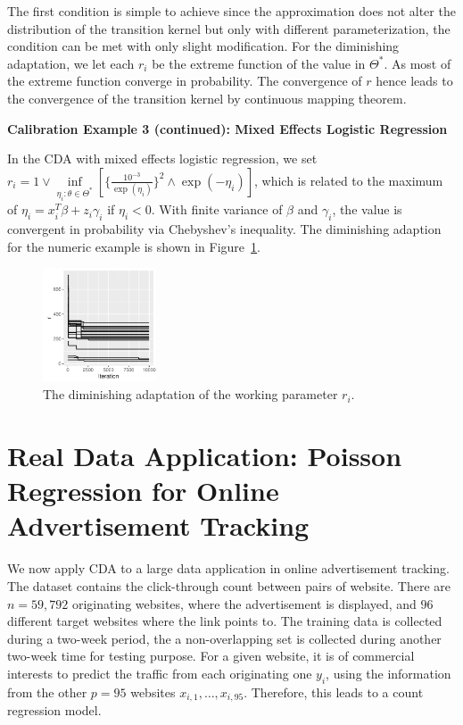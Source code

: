 \documentclass[10pt]{article}
\newcommand{\xbeta}{ x_i^T \beta}
\begin{document}
The first condition is simple to achieve since the approximation does not alter the distribution of the transition kernel but only with different parameterization, the condition can be met with only slight modification. For the diminishing adaptation, we let each $r_i$  be  the extreme function of the value in $\varTheta^*$. As most of the extreme function converge in probability. The convergence of $r$ hence leads to the convergence of the transition kernel by continuous mapping theorem.

{\bf Calibration Example 3 (continued): Mixed Effects Logistic Regression}

In the CDA with mixed effects logistic regression, we set $r_i =  1 \vee \underset{\eta_i: \theta\in \varTheta^*}{\inf}[\{\frac{10^{-3} }{\exp(\eta_i)}\}^2  \wedge {\exp(-\eta_i)} ]   $, which is related to the maximum of $\eta_i=\xbeta+z_i\gamma_i$ if $\eta_i<0$. With finite variance of $\beta$ and $\gamma_i$, the value is convergent in probability via Chebyshev's inequality. The diminishing adaption for the numeric example is shown in Figure~\ref{diminishing_adapt}.

 \begin{figure}[H]
 \centering
 \includegraphics[width=0.3\textwidth]{r_adaptation.pdf}
  \caption{The diminishing adaptation of the working parameter $r_i$.}
  \label{diminishing_adapt}
 \end{figure}

\section{Real Data Application: Poisson Regression for Online Advertisement Tracking}

We now apply CDA to a large data application in online advertisement tracking. The dataset contains the click-through count between pairs of website. There are $n=59,792$ originating websites, where the advertisement is displayed, and $96$ different target websites where the link points to. The training data is collected during a two-week period, the a non-overlapping set is collected during another two-week time for testing purpose. For a given website, it is of commercial interests to predict the traffic from each originating one $y_i$, using the information from the other $p=95$ websites $x_{i,1},\ldots, x_{i,95}$. Therefore, this leads to a count regression model.
\end{document}
